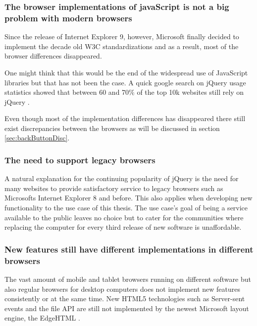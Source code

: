 \documentclass[english]{ifimaster}
\begin{document}
\subsubsection{The browser implementations of javaScript is not a big problem with modern browsers}
Since the release of Internet Explorer 9, however, Microsoft finally decided to implement the decade old W3C standardizations and as a result, most of the browser differences disappeared. 

One might think that this would be the end of the widespread use of JavaScript libraries but that has not been the case. A quick google search on jQuery usage statistics showed that between 60 and 70\% of the top 10k websites still rely on jQuery  \parencite{jQueryWiki}  \parencite{jQueryW3Tech} \parencite{builtWith}. 

Even though most of the implementation differences has disappeared there still exist discrepancies between the browsers as will be discussed in section \ref{sec:backButtonDisc}.

\subsubsection{The need to support legacy browsers}
A natural explanation for the continuing popularity of jQuery is the need for many websites to provide satisfactory service to legacy browsers such as Microsofts Internet Explorer 8 and before. This also applies when developing new functionality to the use case of this thesis. The use case's goal of being a service available to the public leaves no choice but to cater for the communities where replacing the computer for every third release of new software is unaffordable. 

\subsubsection{New features still have different implementations in different browsers}
The vast amount of mobile and tablet browsers running on different software but also regular browsers for desktop computers does not implement new features consistently or at the same time. New HTML5 technologies such as Server-sent events and the file API are still not implemented by the newest Microsoft layout engine, the EdgeHTML \parencite{comparison_of_layout_engines}. 
\end{document}
